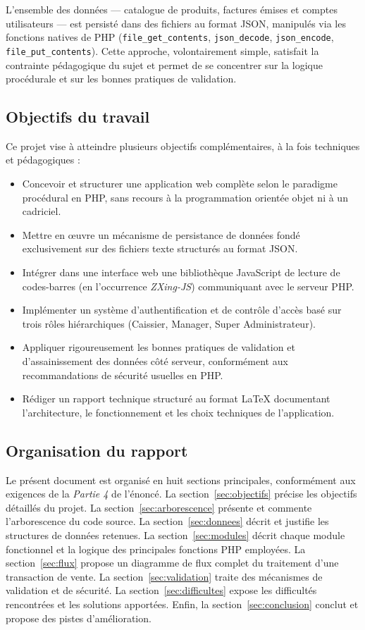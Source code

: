 \documentclass[12pt,a4paper]{article}
\begin{document}
L'ensemble des données --- catalogue de produits, factures émises et comptes utilisateurs --- est persisté dans des fichiers au format JSON, manipulés via les fonctions natives de PHP (\texttt{file\_get\_contents}, \texttt{json\_decode}, \texttt{json\_encode}, \texttt{file\_put\_contents}). Cette approche, volontairement simple, satisfait la contrainte pédagogique du sujet et permet de se concentrer sur la logique procédurale et sur les bonnes pratiques de validation.

\subsection{Objectifs du travail}

Ce projet vise à atteindre plusieurs objectifs complémentaires, à la fois techniques et pédagogiques :

\begin{itemize}[leftmargin=1.5em]
    \item Concevoir et structurer une application web complète selon le paradigme procédural en PHP, sans recours à la programmation orientée objet ni à un cadriciel.
    \item Mettre en \oe{}uvre un mécanisme de persistance de données fondé exclusivement sur des fichiers texte structurés au format JSON.
    \item Intégrer dans une interface web une bibliothèque JavaScript de lecture de codes-barres (en l'occurrence \textit{ZXing-JS}) communiquant avec le serveur PHP.
    \item Implémenter un système d'authentification et de contrôle d'accès basé sur trois rôles hiérarchiques (Caissier, Manager, Super Administrateur).
    \item Appliquer rigoureusement les bonnes pratiques de validation et d'assainissement des données côté serveur, conformément aux recommandations de sécurité usuelles en PHP.
    \item Rédiger un rapport technique structuré au format \LaTeX{} documentant l'architecture, le fonctionnement et les choix techniques de l'application.
\end{itemize}

\subsection{Organisation du rapport}

Le présent document est organisé en huit sections principales, conformément aux exigences de la \textit{Partie 4} de l'énoncé. La section~\ref{sec:objectifs} précise les objectifs détaillés du projet. La section~\ref{sec:arborescence} présente et commente l'arborescence du code source. La section~\ref{sec:donnees} décrit et justifie les structures de données retenues. La section~\ref{sec:modules} décrit chaque module fonctionnel et la logique des principales fonctions PHP employées. La section~\ref{sec:flux} propose un diagramme de flux complet du traitement d'une transaction de vente. La section~\ref{sec:validation} traite des mécanismes de validation et de sécurité. La section~\ref{sec:difficultes} expose les difficultés rencontrées et les solutions apportées. Enfin, la section~\ref{sec:conclusion} conclut et propose des pistes d'amélioration.
\end{document}
